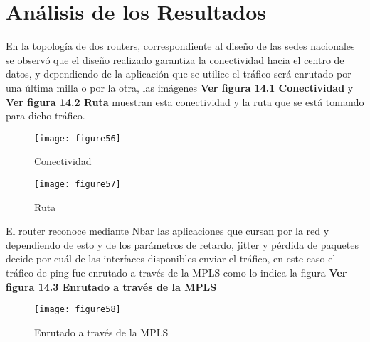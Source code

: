 \chapter{Análisis de los Resultados}
\label{cha:Análisis de los Resultados}

En la topología de dos routers, correspondiente al diseño de las sedes nacionales se observó que el diseño realizado garantiza la conectividad hacia el centro de datos, y dependiendo de la aplicación que se utilice el tráfico será enrutado por una última milla o por la otra, las imágenes  \textbf{Ver figura 14.1 Conectividad} y  \textbf{Ver figura 14.2  Ruta} muestran esta conectividad y la ruta que se está tomando para dicho tráfico. 

\begin{figure}[htbp]
  \centering
    {\texttt{[image: figure56]}}%
  \caption{ Conectividad}
  \label{fig:fig2subfig}
\end{figure}

\begin{figure}[htbp]
  \centering
    {\texttt{[image: figure57]}}%
  \caption{ Ruta}
  \label{fig:fig2subfig}
\end{figure}

El router reconoce mediante Nbar las aplicaciones que cursan por la red y dependiendo de esto y de los parámetros de retardo, jitter y pérdida de paquetes decide por cuál de las interfaces disponibles enviar el tráfico, en este caso el tráfico de ping fue enrutado a través de la MPLS como lo indica la figura \textbf{Ver figura 14.3 Enrutado a través de la MPLS}

\begin{figure}[htbp]
  \centering
    {\texttt{[image: figure58]}}%
  \caption{ Enrutado a través de la MPLS}
  \label{fig:fig2subfig}
\end{figure}

